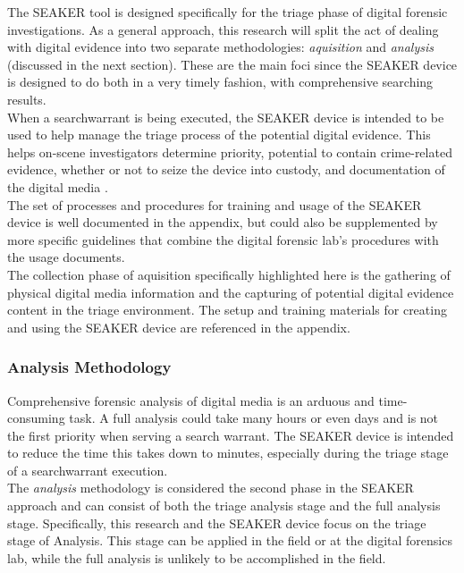 \documentclass[12pt]{article}
\begin{document}
The SEAKER tool is designed specifically for the triage phase of digital forensic
investigations.  As a general approach, this research will split the act of dealing with digital evidence into two
separate methodologies: {\em aquisition} and {\em analysis} (discussed in the next section).
These are the main foci since the SEAKER
device is designed to do both in a very timely fashion, with comprehensive searching results.\\

When a \gls{searchwarrant} is being executed, the SEAKER device is intended to be used to help
manage the triage process of the potential digital evidence.  This helps on-scene investigators
determine priority, potential to contain crime-related evidence, whether or not to seize the
device into custody, and documentation of the digital media \cite{hitchcock2016tiered}.\\ 

The set of processes and procedures for training and usage of the SEAKER device is well
documented in the appendix, but could also be supplemented by more specific guidelines that
combine the digital forensic lab's procedures with the usage documents.\\

The collection phase of aquisition specifically highlighted here is the gathering
of physical digital media information and the capturing of potential digital evidence content
in the triage environment.  The setup and training materials for creating and using the
SEAKER device are referenced in the appendix.\\

\subsubsection{Analysis Methodology}

Comprehensive forensic analysis of digital media is an arduous and time-consuming task.  A full
analysis could take many hours or even days and is not the first priority when serving a search
warrant.  The SEAKER device is intended to reduce the time this takes down to minutes,
especially during the triage stage of a \gls{searchwarrant} execution.\\

The {\em analysis} methodology is considered the second phase in the SEAKER approach and 
can consist of both the triage analysis stage and the full analysis stage.
Specifically, this research and the SEAKER device focus on the triage stage of Analysis.  This
stage can be applied in the field or at the digital forensics lab, while the full analysis
is unlikely to be accomplished in the field.\\
\end{document}
